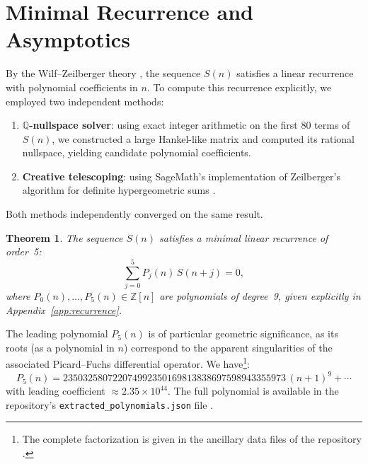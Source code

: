 \documentclass[11pt, a4paper]{article}
\newtheorem{theorem}{Theorem}
\begin{document}
\section{Minimal Recurrence and Asymptotics}\label{sec:recurrence}

By the Wilf--Zeilberger theory \cite{PetkovsekWilfZeilberger1996}, the sequence $S(n)$ satisfies a linear recurrence with polynomial coefficients in $n$. To compute this recurrence explicitly, we employed two independent methods:
\begin{enumerate}
    \item \textbf{$\mathbb{Q}$-nullspace solver}: using exact integer arithmetic on the first 80 terms of $S(n)$, we constructed a large Hankel-like matrix and computed its rational nullspace, yielding candidate polynomial coefficients.
    \item \textbf{Creative telescoping}: using SageMath's implementation of Zeilberger's algorithm for definite hypergeometric sums \cite{PetkovsekWilfZeilberger1996}.
\end{enumerate}
Both methods independently converged on the same result.

\begin{theorem}\label{thm:recurrence}
The sequence $S(n)$ satisfies a minimal linear recurrence of order~5:
\begin{equation}\label{eq:recurrence}
  \sum_{j=0}^{5} P_j(n)\, S(n+j) = 0,
\end{equation}
where $P_0(n), \dots, P_5(n) \in \mathbb{Z}[n]$ are polynomials of degree~9, given explicitly in Appendix~\ref{app:recurrence}.
\end{theorem}

The leading polynomial $P_5(n)$ is of particular geometric significance, as its roots (as a polynomial in $n$) correspond to the apparent singularities of the associated Picard--Fuchs differential operator. We have\footnote{The complete factorization is given in the ancillary data files of the repository \cite{repo}.}:
\begin{equation}\label{eq:P5}
  P_5(n) = 235032580722074992350169813838697598943355973\,(n+1)^9 + \cdots
\end{equation}
with leading coefficient $\approx 2.35 \times 10^{44}$. The full polynomial is available in the repository's \texttt{extracted\_polynomials.json} file \cite{repo}.
\end{document}
